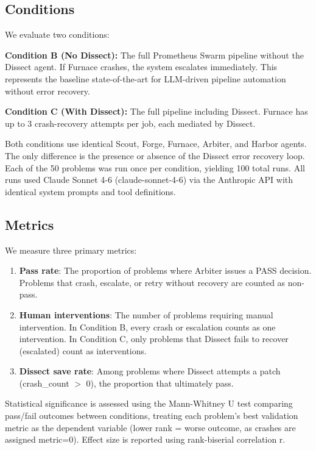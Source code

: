 \documentclass[conference]{IEEEtran}
\begin{document}
\subsection{Conditions}

We evaluate two conditions:

\textbf{Condition B (No Dissect):} The full Prometheus Swarm pipeline without the
Dissect agent. If Furnace crashes, the system escalates immediately. This represents the
baseline state-of-the-art for LLM-driven pipeline automation without error recovery.

\textbf{Condition C (With Dissect):} The full pipeline including Dissect. Furnace has up
to 3 crash-recovery attempts per job, each mediated by Dissect.

Both conditions use identical Scout, Forge, Furnace, Arbiter, and Harbor agents. The only
difference is the presence or absence of the Dissect error recovery loop. Each of the 50
problems was run once per condition, yielding 100 total runs. All runs used Claude Sonnet
4-6 (claude-sonnet-4-6) via the Anthropic API with identical system prompts and tool
definitions.

\subsection{Metrics}

We measure three primary metrics:

\begin{enumerate}
  \item \textbf{Pass rate}: The proportion of problems where Arbiter issues a PASS
  decision. Problems that crash, escalate, or retry without recovery are counted as
  non-pass.

  \item \textbf{Human interventions}: The number of problems requiring manual
  intervention. In Condition B, every crash or escalation counts as one intervention. In
  Condition C, only problems that Dissect fails to recover (escalated) count as
  interventions.

  \item \textbf{Dissect save rate}: Among problems where Dissect attempts a patch
  (crash\_count $>$ 0), the proportion that ultimately pass.
\end{enumerate}

Statistical significance is assessed using the Mann-Whitney U test comparing pass/fail
outcomes between conditions, treating each problem's best validation metric as the
dependent variable (lower rank = worse outcome, as crashes are assigned metric=0).
Effect size is reported using rank-biserial correlation r.
\end{document}
